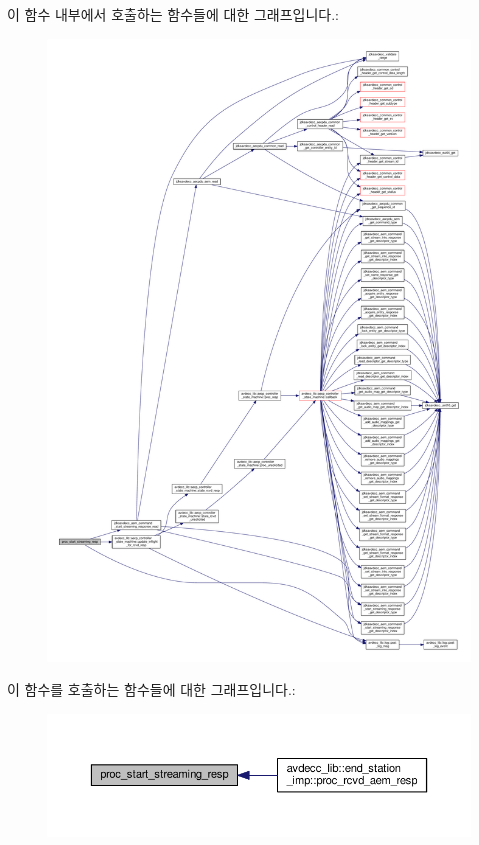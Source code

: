 이 함수 내부에서 호출하는 함수들에 대한 그래프입니다.\+:
\nopagebreak
\begin{figure}[H]
\begin{center}
\leavevmode
\includegraphics[width=350pt]{classavdecc__lib_1_1stream__input__descriptor__imp_a00065113c82302cc2e166c7a0c5f53c5_cgraph}
\end{center}
\end{figure}




이 함수를 호출하는 함수들에 대한 그래프입니다.\+:
\nopagebreak
\begin{figure}[H]
\begin{center}
\leavevmode
\includegraphics[width=350pt]{classavdecc__lib_1_1stream__input__descriptor__imp_a00065113c82302cc2e166c7a0c5f53c5_icgraph}
\end{center}
\end{figure}


